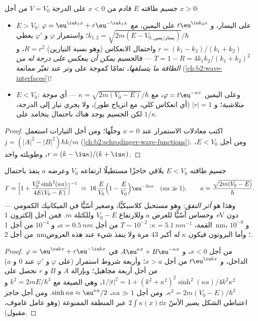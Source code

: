 \begin{proposition}\label{prop:b2:potential-wells-tunneling:step}
جسيم طاقته $E$ قادم من $x < 0$ على الدرجة $V = V_0$
من أجل $x > 0$:
\begin{itemize}
\item $E > V_0$: $\varphi = \eu^{\iu k_1x} + r\eu^{-\iu k_1x}$ على اليسار، و $t\eu^{\iu
      k_2x}$ على اليمين، مع $k_{1,2} = \sqrt{2m(E - V_{0,\text{يسار/يمين}})}/
      \hbar$؛ واستمرار $\varphi$ و $\varphi'$ يعطي $r = (k_1 - k_2)/(k_1
      + k_2)$ واحتمال الانعكاس (وهو نسبة التيارين) $R = r^2$،
      و $T = 1 - R = 4k_1k_2/(k_1 + k_2)^2$ --- فالجسيم \emph{يمكن أن
      ينعكس على درجة له من الطاقة ما يتسلقها}، تمامًا كموجة على
      وتر عند تغيّر ممانعة (\cref{ch:b2:wave-interfaces})؛
\item $E < V_0$: وعلى اليمين $\varphi = t\eu^{-\kappa x}$، مع $\kappa = \sqrt{2m(V_0
      - E)}/\hbar$ --- أي \emph{موجة متلاشية}؛ و $|r| = 1$ (أي انعكاس كلي، مع انزياح طور)، ولا
      يجري تيار إلى الدرجة، لكن الجسيم يوجد هناك باحتمال
      يتخامد على $1/\kappa$.
\end{itemize}
\end{proposition}

\begin{proof}
اكتب معادلات الاستمرار عند $x = 0$ وحلّها؛ ومن أجل التيارات
استعمل $j = (|A|^2 - |B|^2)\hbar k/m$ (\cref{ch:b2:schrodinger-wave-functions}).
ومن أجل $E < V_0$، $r = (k - \iu\kappa)/(k + \iu\kappa)$، وطويلته واحد.
\end{proof}

\begin{theorem}\label{thm:b2:potential-wells-tunneling:tunnel}
جسيم طاقته $E < V_0$ يلاقي حاجزًا مستطيلًا ارتفاعه
$V_0$ وعرضه $a$ ينفذ باحتمال
\[
T = \Big[1 + \frac{V_0^2\sinh^2(\kappa a)}{4E(V_0 - E)}\Big]^{-1}
\ \approx\ 16\,\frac{E}{V_0}\Big(1 - \frac{E}{V_0}\Big)\eu^{-2\kappa a}
\quad (\kappa a \gg 1), \qquad
\kappa = \frac{\sqrt{2m(V_0 - E)}}{\hbar} .
\]
وهذا هو \emph{أثر النفق}: وهو مستحيل
كلاسيكيًّا، وصغير أسّيًّا في الميكانيك الكمومي --- وحساس
أسّيًّا للعرض $a$ وللارتفاع $V_0 - E$ وللكتلة
$m$. فمن أجل إلكترون \qty{1}{eV} دون القمة، $\kappa = \qty{5.1}{nm^{-1}}$:
$T \sim 10^{-2}$ من أجل $a = \qty{0.5}{nm}$، و $10^{-4}$ من أجل \qty{1}{nm}، و $10^{-9}$ من أجل
\qty{2}{nm}؛ وأما البروتون فيكون $\kappa$ له أكبر $43$ مرة ولا ينفذ شيء
عند هذه العروض.
\end{theorem}

\begin{proof}
$\varphi = \eu^{\iu kx} + r\eu^{-\iu kx}$ من أجل $x < 0$، و $A\eu^{\kappa x} + B\eu^{-\kappa x}$
في الداخل، و $t\eu^{\iu kx}$ من أجل $x > a$؛ وأربعة شروط استمرار (على $\varphi$
و $\varphi'$ عند $0$ و $a$) من أجل أربعة مجاهيل؛ وبإزالة $A$ و $B$ و $r$
نحصل على $1/|t|^2 = 1 + (k^2 + \kappa^2)^2\sinh^2(\kappa a)/4k^2\kappa^2$، وهي
الصيغة مع $k^2 = 2mE/\hbar^2$ و $\kappa^2 = 2m(V_0 - E)/\hbar^2$. ومن أجل
$\kappa a \gg 1$، $\sinh\kappa a \approx \eu^{\kappa a}/2$. ومن أجل حاجز
اعتباطي الشكل يصير الأسّ $2\int\kappa(x)\dd x$ عبر
المنطقة الممنوعة (وهو عامل غاموف، مقبول).
\end{proof}

